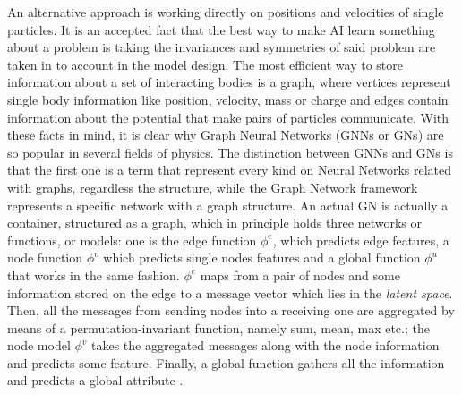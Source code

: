 \documentclass[../../master_thesis_np.tex]{subfiles}
\begin{document}
	An alternative approach is working directly on positions and velocities of single particles. It is an accepted fact that the best way to make AI learn something about a problem is taking the invariances and symmetries of said problem are taken in to account in the model design. The most efficient way to store information about a set of interacting bodies is a graph, where vertices represent single body information like position, velocity, mass or charge and edges contain information about the potential that make pairs of particles communicate. With these facts in mind, it is clear why Graph Neural Networks (GNNs or GNs) are so popular in several fields of physics. The distinction between GNNs and GNs is that the first one is a term that represent every kind on Neural Networks related with graphs, regardless the structure, while the Graph Network framework represents a specific network with a graph structure. An actual GN is actually a container, structured as a graph, which in principle holds three networks or functions, or models: one is the edge function $\phi^e$, which predicts edge features, a node function $\phi^v$ which predicts single nodes features and a global function $\phi^u$ that works in the same fashion. $\phi^e$ maps from a pair of nodes and some information stored on the edge to a message vector which lies in the \emph{latent space}. Then, all the messages from sending nodes into a receiving one  are aggregated by means of a permutation-invariant function, namely sum, mean, max etc.; the node model $\phi^v$ takes the aggregated messages along with the node information and predicts some feature. Finally, a global function gathers all the information and predicts a global attribute \cite{battaglia_relational_2018}.
	
\end{document}
